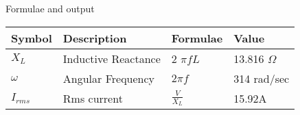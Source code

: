\setlength{\arrayrulewidth}{0.3mm}
\setlength{\tabcolsep}{12pt}
\renewcommand{\arraystretch}{1.3}


\begin{center}
\caption{Formulae and output}
\begin{tabular}{ |p{1.5cm}|p{1.5cm}|p{1.5cm}|p{1.5cm}|  }

\hline
{Symbol} & {Description} & {Formulae} & {Value} \\
\hline
$X_{L}$ & Inductive Reactance & 2 $\pi fL$ & 13.816 $\Omega$ \\
\hline
$\omega$ & Angular Frequency & $2\pi f$ & 314 rad/sec \\
\hline
$I_{rms}$ & Rms current & $\frac{V}{X_{L}}$ & 15.92A \\
\hline


\end{tabular}
\end{center}
